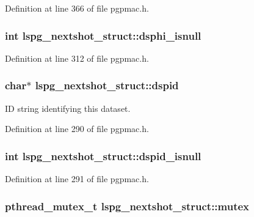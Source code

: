 Definition at line 366 of file pgpmac.\-h.

\hypertarget{structlspg__nextshot__struct_a2d1f51cb1bb575a214344773136be878}{
\subsubsection[{dsphi\-\_\-isnull}]{\setlength{\rightskip}{0pt plus 5cm}int lspg\-\_\-nextshot\-\_\-struct\-::dsphi\-\_\-isnull}}\label{structlspg__nextshot__struct_a2d1f51cb1bb575a214344773136be878}


Definition at line 312 of file pgpmac.\-h.

\hypertarget{structlspg__nextshot__struct_a4487e718c2b55a8ab9ebb18329574ae1}{
\subsubsection[{dspid}]{\setlength{\rightskip}{0pt plus 5cm}char$\ast$ lspg\-\_\-nextshot\-\_\-struct\-::dspid}}\label{structlspg__nextshot__struct_a4487e718c2b55a8ab9ebb18329574ae1}


I\-D string identifying this dataset. 



Definition at line 290 of file pgpmac.\-h.

\hypertarget{structlspg__nextshot__struct_a7665485395487756ab448d0c81c84d10}{
\subsubsection[{dspid\-\_\-isnull}]{\setlength{\rightskip}{0pt plus 5cm}int lspg\-\_\-nextshot\-\_\-struct\-::dspid\-\_\-isnull}}\label{structlspg__nextshot__struct_a7665485395487756ab448d0c81c84d10}


Definition at line 291 of file pgpmac.\-h.

\hypertarget{structlspg__nextshot__struct_a38b657155fbee9b73278f76912cf2333}{
\subsubsection[{mutex}]{\setlength{\rightskip}{0pt plus 5cm}pthread\-\_\-mutex\-\_\-t lspg\-\_\-nextshot\-\_\-struct\-::mutex}}\label{structlspg__nextshot__struct_a38b657155fbee9b73278f76912cf2333}


